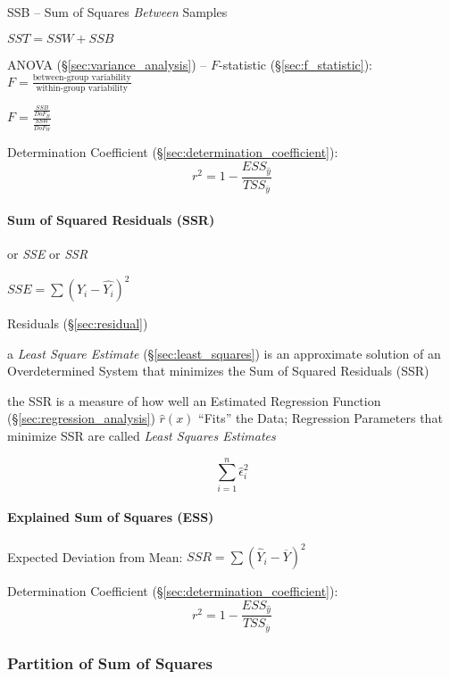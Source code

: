 SSB -- Sum of Squares \emph{Between} Samples

$SST = SSW + SSB$

ANOVA (\S\ref{sec:variance_analysis}) --
$F$-statistic (\S\ref{sec:f_statistic}):
$F = \frac{\text{between-group variability}}{\text{within-group variability}}$

$F = \frac{\frac{SSB}{DoF_B}}{\frac{SSW}{DoF_W}}$

Determination Coefficient (\S\ref{sec:determination_coefficient}):
\[
  r^2 = 1 - \frac{
    ESS_{\hat{y}}
  }{
    TSS_{\overline{y}}
  }
\]



\paragraph{Sum of Squared Residuals (SSR)}\label{sec:ssr}\hfill

or \emph{SSE} or \emph{SSR}

$SSE = \sum(Y_i - \hat{Y_i})^2$

Residuals (\S\ref{sec:residual})

\fist a \emph{Least Square Estimate} (\S\ref{sec:least_squares}) is an
approximate solution of an Overdetermined System that minimizes the Sum of
Squared Residuals (SSR)

the SSR is a measure of how well an Estimated Regression Function
(\S\ref{sec:regression_analysis}) $\hat{r}(x)$ ``Fits'' the Data; Regression
Parameters that minimize SSR are called \emph{Least Squares Estimates}

\[
  \sum_{i=1}^n \hat{\epsilon}_i^2
\]



\paragraph{Explained Sum of Squares (ESS)}\label{sec:ess}\hfill

Expected Deviation from Mean: $SSR = \sum(\hat{Y}_i - \overline{Y})^2$

Determination Coefficient (\S\ref{sec:determination_coefficient}):
\[
  r^2 = 1 - \frac{
    ESS_{\hat{y}}
  }{
    TSS_{\overline{y}}
  }
\]



\subsubsection{Partition of Sum of Squares}\label{sec:partition_squares}

